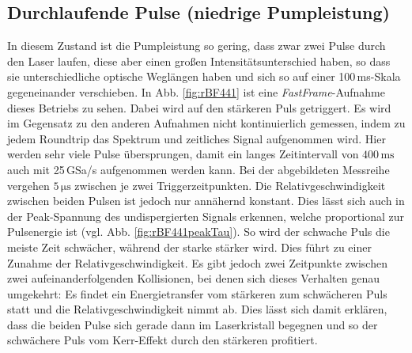 \documentclass[bachelor,       %
               twoside,        %
               BCOR10mm,       %
               liststotoc,nomtotoc,bibtotoc, %
               english,ngerman, %
               final,          %
               ]{GAUBM}
\begin{document}
\subsection{Durchlaufende Pulse (niedrige Pumpleistung)}
In diesem Zustand ist die Pumpleistung so gering, dass zwar zwei Pulse durch den Laser laufen, diese aber einen großen Intensitätsunterschied haben, so dass sie unterschiedliche optische Weglängen haben und sich so auf einer 100\,ms-Skala gegeneinander verschieben.
In Abb. \ref{fig:rBF441} ist eine \textit{FastFrame}-Aufnahme dieses Betriebs zu sehen.
Dabei wird auf den stärkeren Puls getriggert.
Es wird im Gegensatz zu den anderen Aufnahmen nicht kontinuierlich gemessen, indem zu jedem Roundtrip das Spektrum und zeitliches Signal aufgenommen wird.
Hier werden sehr viele Pulse übersprungen, damit ein langes Zeitintervall von $400\,\si{\milli\second}$ auch mit 25\,GSa/s  aufgenommen werden kann.
Bei der abgebildeten Messreihe vergehen $5\,\si{\micro\second}$ zwischen je zwei Triggerzeitpunkten.
Die Relativgeschwindigkeit zwischen beiden Pulsen ist jedoch nur annähernd konstant.
Dies lässt sich auch in der Peak-Spannung des undispergierten Signals erkennen, welche proportional zur Pulsenergie ist (vgl. Abb. \ref{fig:rBF441peakTau}).
So wird der schwache Puls die meiste Zeit schwächer, während der starke stärker wird.
Dies führt zu einer Zunahme der Relativgeschwindigkeit.
Es gibt jedoch zwei Zeitpunkte zwischen zwei aufeinanderfolgenden Kollisionen, bei denen sich dieses Verhalten genau umgekehrt: Es findet ein Energietransfer vom stärkeren zum schwächeren Puls statt und die Relativgeschwindigkeit nimmt ab.
Dies lässt sich damit erklären, dass die beiden Pulse sich gerade dann im Laserkristall begegnen und so der schwächere Puls vom Kerr-Effekt durch den stärkeren profitiert.
\end{document}
